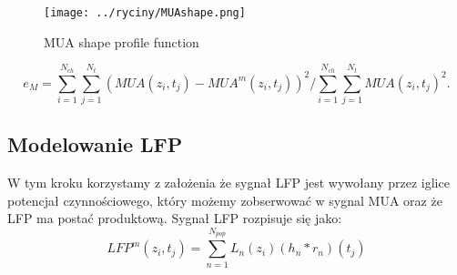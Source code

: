 \begin{figure}
\caption{MUA shape profile function}
\label{MUAshape}
\texttt{[image: ../ryciny/MUAshape.png]}
\end{figure}

\begin{equation}
e_M = \sum^{N_{ch}}_{i=1}\sum^{N_t}_{j=1} \left( MUA(z_i, t_j) - MUA^m(z_i, t_j) \right)^2/ \sum^{N_{ch}}_{i=1}\sum^{N_t}_{j=1} MUA(z_i, t_j)^2.
\label{MUAerror}
\end{equation}

\subsection{Modelowanie LFP}
W tym kroku korzystamy z założenia że sygnał LFP jest wywołany przez iglice potencjał czynnościowego, który możemy zobserwować w sygnal MUA oraz że LFP ma postać produktową. Sygnał LFP rozpisuje się jako:
\begin{equation}
 LFP^m(z_i, t_j) = \sum^{N_{pop}}_{n=1}L_n(z_i)(h_n*r_n)(t_j)
\end{equation}
